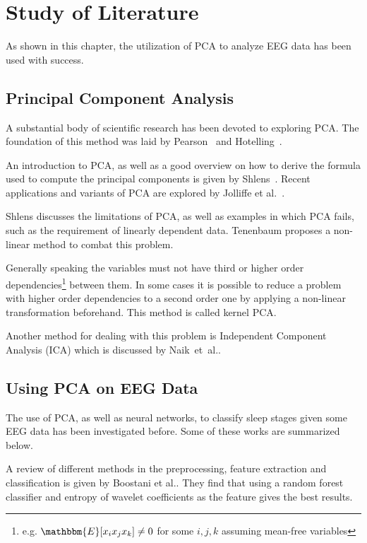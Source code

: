 \chapter{Study of Literature}
\label{chapter:study_of_literature}

As shown in this chapter, the utilization of PCA to analyze EEG data has been used with success.

\section{Principal Component Analysis}

A substantial body of scientific research has been devoted to exploring PCA.
The foundation of this method was laid by Pearson~\cite{Pearson1901} and Hotelling~\cite{Hotelling1933}.

An introduction to PCA, as well as a good overview on how to derive the formula used to compute the principal components is given by Shlens~\cite{Shlens2014}.
Recent applications and variants of PCA are explored by Jolliffe et al.~\cite{Jolliffe2016}.

Shlens discusses the limitations of PCA, as well as examples in which PCA fails, such as the requirement of linearly dependent data.
Tenenbaum proposes a non-linear method to combat this problem\cite{Tenenbaum2000}.

Generally speaking the variables must not have third or higher order dependencies\footnote{e.g. $\mathbbm{E}[x_ix_jx_k] \neq 0$ for some $i, j, k$ assuming mean-free variables} between them. In some cases it is possible to reduce a problem with higher order dependencies to a second order one by applying a non-linear transformation beforehand. This method is called kernel PCA\cite{Scholkopf1997}.

Another method for dealing with this problem is Independent Component Analysis (ICA) which is discussed by Naik~et~al.\cite{Naik2011}.

\section{Using PCA on EEG Data}

The use of PCA, as well as neural networks, to classify sleep stages given some EEG data has been investigated before. Some of these works are summarized below.

A review of different methods in the preprocessing, feature extraction and classification is given by Boostani et al.\cite{Boostani2017}. They find that using a random forest classifier\cite{Breiman2001} and entropy of wavelet coefficients\cite{Chui1994} as the feature gives the best results.

